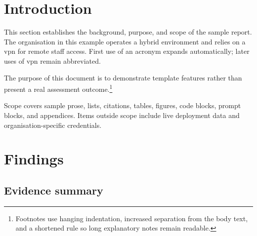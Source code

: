 \documentclass[12pt, a4paper]{article}
\begin{document}
\newpage



\section{Introduction}
\label{sec:introduction}

This section establishes the background, purpose, and scope of the sample
report. The organisation in this example operates a hybrid environment and
relies on a \gls{vpn} for remote staff access. First use of an acronym
expands automatically; later uses of \gls{vpn} remain abbreviated.

The purpose of this document is to demonstrate template features rather
than present a real assessment outcome.\footnote{Footnotes use hanging
indentation, increased separation from the body text, and a shortened
rule so long explanatory notes remain readable.}

Scope covers sample prose, lists, citations, tables, figures, code
blocks, prompt blocks, and appendices. Items outside scope include live
deployment data and organisation-specific credentials.


\section{Findings}
\label{sec:findings}

\subsection{Evidence summary}
\label{subsec:findings-evidence}
\end{document}
